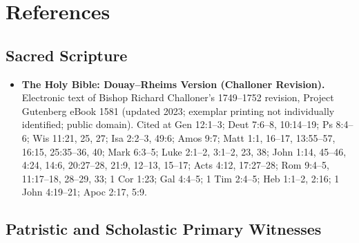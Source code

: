 \section{References}

\subsection*{Sacred Scripture}

\begin{itemize}
\item \textbf{The Holy Bible: Douay--Rheims Version (Challoner Revision).} Electronic text of Bishop Richard Challoner's 1749--1752 revision, Project Gutenberg eBook 1581 (updated 2023; exemplar printing not individually identified; public domain). Cited at Gen 12:1--3; Deut 7:6--8, 10:14--19; Ps 8:4--6; Wis 11:21, 25, 27; Isa 2:2--3, 49:6; Amos 9:7; Matt 1:1, 16--17, 13:55--57, 16:15, 25:35--36, 40; Mark 6:3--5; Luke 2:1--2, 3:1--2, 23, 38; John 1:14, 45--46, 4:24, 14:6, 20:27--28, 21:9, 12--13, 15--17; Acts 4:12, 17:27--28; Rom 9:4--5, 11:17--18, 28--29, 33; 1 Cor 1:23; Gal 4:4--5; 1 Tim 2:4--5; Heb 1:1--2, 2:16; 1 John 4:19--21; Apoc 2:17, 5:9.
\end{itemize}

\subsection*{Patristic and Scholastic Primary Witnesses}

